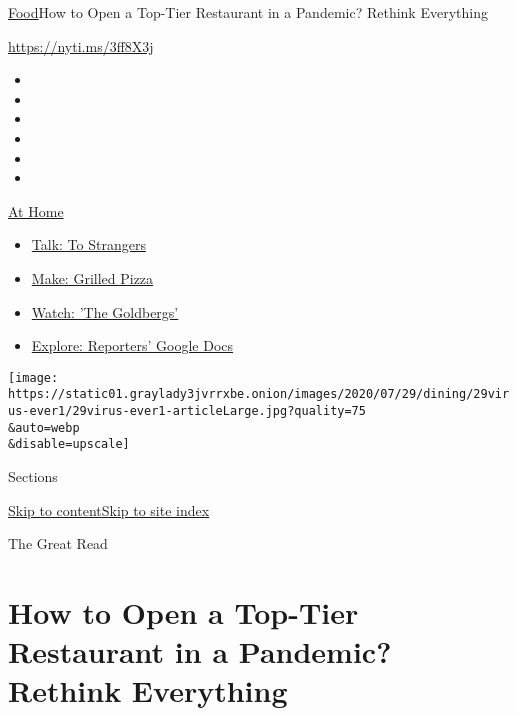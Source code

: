 \href{/section/food}{Food}\textbar{}How to Open a Top-Tier Restaurant in
a Pandemic? Rethink Everything

\url{https://nyti.ms/3ff8X3j}

\begin{itemize}
\item
\item
\item
\item
\item
\item
\end{itemize}

\href{https://www.nytimes3xbfgragh.onion/spotlight/at-home?action=click\&pgtype=Article\&state=default\&region=TOP_BANNER\&context=at_home_menu}{At
Home}

\begin{itemize}
\tightlist
\item
  \href{https://www.nytimes3xbfgragh.onion/2020/08/03/well/family/the-benefits-of-talking-to-strangers.html?action=click\&pgtype=Article\&state=default\&region=TOP_BANNER\&context=at_home_menu}{Talk:
  To Strangers}
\item
  \href{https://www.nytimes3xbfgragh.onion/2020/08/01/at-home/coronavirus-make-pizza-on-a-grill.html?action=click\&pgtype=Article\&state=default\&region=TOP_BANNER\&context=at_home_menu}{Make:
  Grilled Pizza}
\item
  \href{https://www.nytimes3xbfgragh.onion/2020/07/31/arts/television/goldbergs-abc-stream.html?action=click\&pgtype=Article\&state=default\&region=TOP_BANNER\&context=at_home_menu}{Watch:
  'The Goldbergs'}
\item
  \href{https://www.nytimes3xbfgragh.onion/interactive/2020/at-home/even-more-reporters-editors-diaries-lists-recommendations.html?action=click\&pgtype=Article\&state=default\&region=TOP_BANNER\&context=at_home_menu}{Explore:
  Reporters' Google Docs}
\end{itemize}

\texttt{[image: https://static01.graylady3jvrrxbe.onion/images/2020/07/29/dining/29virus-ever1/29virus-ever1-articleLarge.jpg?quality=75\\\&auto=webp\\\&disable=upscale]}

Sections

\protect\hyperlink{site-content}{Skip to
content}\protect\hyperlink{site-index}{Skip to site index}

The Great Read

\hypertarget{how-to-open-a-top-tier-restaurant-in-a-pandemic-rethink-everything}{%
\section{How to Open a Top-Tier Restaurant in a Pandemic? Rethink
Everything}\label{how-to-open-a-top-tier-restaurant-in-a-pandemic-rethink-everything}}

